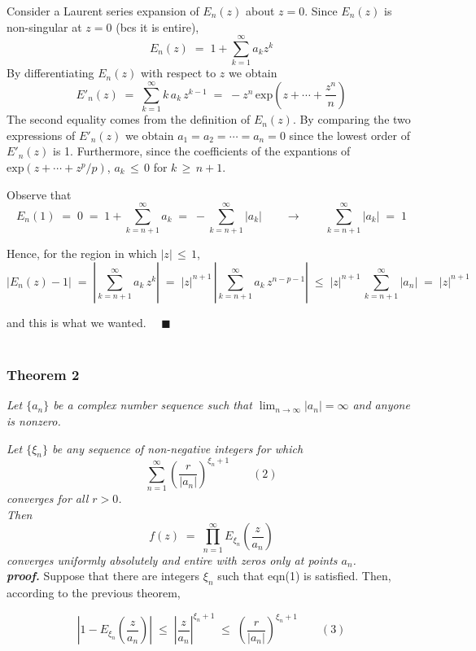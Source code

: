 Consider a Laurent series expansion of $E_n (z)$ about $z=0$. Since $E_n (z)$ is non-singular at $z=0$ (bcs it is entire), $$ E_n (z) \;=\; 1 + \sum_{k=1}^{\infty} a_k z^k $$ By differentiating $ E_n (z) $ with respect to $z$ we obtain $$ E'_n (z) \;=\; \sum_{k=1}^{\infty} k\, a_k\, z^{k-1} \;=\; - z^n \,\mathrm{exp}\left( z + \cdots + \frac{z^n}{n} \right) $$ The second equality comes from the definition of $E_n (z)$. By comparing the two expressions of $E'_n (z)$ we obtain $ a_1 = a_2 = \cdots = a_n = 0$ since the lowest order of $E'_n (z)$ is 1. Furthermore, since the coefficients of the expantions of $\mathrm{exp}(z+\cdots+z^p /p)$, $ a_k \,\le\, 0 $ for $ k \,\ge\, n+1 $. 

Observe that $$ E_n (1) \;=\; 0 \;=\; 1 + \sum_{k = n+1}^{\infty} a_k \;=\; - \sum_{k = n+1}^{\infty} |a_k| \qquad \longrightarrow \qquad \sum_{k = n+1}^{\infty} |a_k| \;=\; 1 $$

Hence, for the region in which $|z| \,\le\, 1$, $$ | E_n (z) - 1 | \;=\; \left| \sum_{k=n+1}^{\infty} a_k \, z^k \right| \;=\; |z|^{n+1} \, \left| \sum_{k = n+1}^{\infty} a_k \, z^{n-p-1} \right| \;\le\; |z|^{n+1} \, \sum_{k=n+1}^{\infty} | a_n | \;=\; |z|^{n+1} $$

and this is what we wanted. $\quad \blacksquare$ \\ \\


\subsubsection*{Theorem 2 \\[-0.6cm]}
\textit{Let $\{ a_n \}$ be a complex number sequence such that $ \lim_{n \to \infty} | a_n | = \infty $ and anyone is nonzero.}

\textit{Let $\{ \xi_n \}$ be any sequence of non-negative integers for which $$ \sum_{n=1}^{\infty} \left( \frac{r}{|a_n|} \right)^{\xi_n + 1} \qquad (2) $$ converges for all $r>0$.}\\

\textit{Then $$ f(z) \;=\; \prod_{n=1}^{\infty} E_{\xi_n} \left( \frac{z}{a_n} \right) $$ converges uniformly absolutely and entire with zeros only at points $a_n$.} \\

\textbf{\textit{proof.}}
Suppose that there are integers $\xi_n$ such that eqn(1) is satisfied. Then, according to the previous theorem,

$$ \left| 1 - E_{\xi_n} \left(\frac{z}{a_n}\right) \right| \; \le \; \left| \frac{z}{a_n} \right|^{\xi_n + 1} \; \le \; \left( \frac{r}{|a_n|} \right)^{\xi_n + 1} \qquad (3) $$ 

